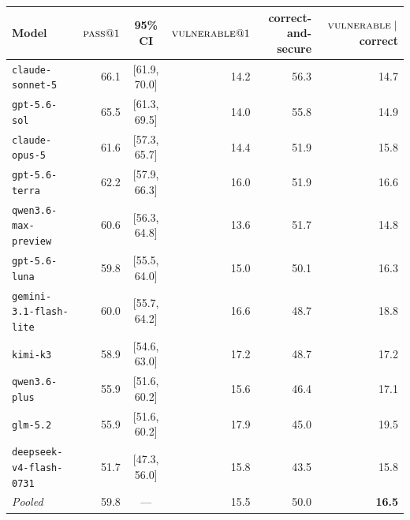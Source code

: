 \begin{tabular}{lrcrrr}
\toprule
Model & $\textsc{pass}{}@1$ & 95\% CI & $\textsc{vulnerable}{}@1$ & correct-and-secure & $\textsc{vulnerable}{}\mid$correct \\
\midrule
\texttt{claude-sonnet-5             } & 66.1 & [61.9, 70.0] & 14.2 & 56.3 & 14.7 \\
\texttt{gpt-5.6-sol                 } & 65.5 & [61.3, 69.5] & 14.0 & 55.8 & 14.9 \\
\texttt{claude-opus-5               } & 61.6 & [57.3, 65.7] & 14.4 & 51.9 & 15.8 \\
\texttt{gpt-5.6-terra               } & 62.2 & [57.9, 66.3] & 16.0 & 51.9 & 16.6 \\
\texttt{qwen3.6-max-preview         } & 60.6 & [56.3, 64.8] & 13.6 & 51.7 & 14.8 \\
\texttt{gpt-5.6-luna                } & 59.8 & [55.5, 64.0] & 15.0 & 50.1 & 16.3 \\
\texttt{gemini-3.1-flash-lite       } & 60.0 & [55.7, 64.2] & 16.6 & 48.7 & 18.8 \\
\texttt{kimi-k3                     } & 58.9 & [54.6, 63.0] & 17.2 & 48.7 & 17.2 \\
\texttt{qwen3.6-plus                } & 55.9 & [51.6, 60.2] & 15.6 & 46.4 & 17.1 \\
\texttt{glm-5.2                     } & 55.9 & [51.6, 60.2] & 17.9 & 45.0 & 19.5 \\
\texttt{deepseek-v4-flash-0731      } & 51.7 & [47.3, 56.0] & 15.8 & 43.5 & 15.8 \\
\midrule
\textit{Pooled} & 59.8 & --- & 15.5 & 50.0 & \textbf{16.5} \\
\bottomrule
\end{tabular}
